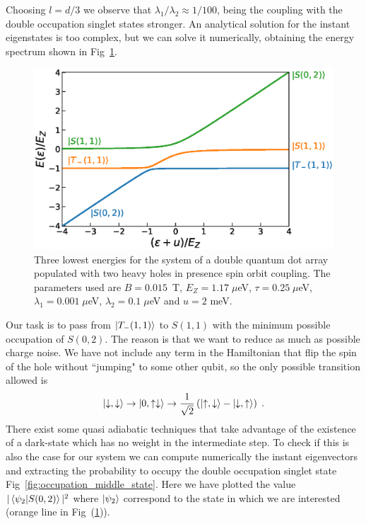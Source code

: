 \documentclass[a4paper,11pt]{article}
\begin{document}
Choosing $l=d/3$ we observe that $\lambda_1/\lambda_2\approx 1/100$, being the coupling with the double occupation singlet states stronger. An analytical solution for the instant eigenstates is too complex, but we can solve it numerically, obtaining the energy spectrum shown in Fig~\ref{fig:eigenenergies_2QD_2HH_w_SOC}.
\begin{figure}[!htbp]
	\centering
	\includegraphics[width=0.8\linewidth]{eigenenergies_2QD_2HH_w_SOC.eps}
	\caption{Three lowest energies for the system of a double quantum dot array populated with two heavy holes in presence spin orbit coupling. The parameters used are $B=0.015$~T, $E_Z=1.17\; \mu$eV, $\tau=0.25\; \mu$eV, $\lambda_1=0.001\; \mu$eV, $\lambda_2=0.1\; \mu$eV and $u=2$ meV.}
	\label{fig:eigenenergies_2QD_2HH_w_SOC}
\end{figure}
Our task is to pass from $\ket{T_-(1,1)}$ to $S(1,1)$ with the minimum possible occupation of $S(0,2)$. The reason is that we want to reduce as much as possible charge noise. We have not include any term in the Hamiltonian that flip the spin of the hole without ``jumping" to some other qubit, so the only possible transition allowed is
\begin{equation}
	\ket{\downarrow,\downarrow}\rightarrow \ket{0,\uparrow\downarrow} \rightarrow \frac{1}{\sqrt{2}}\left(\ket{\uparrow,\downarrow}-\ket{\downarrow,\uparrow}\right)\; .
\end{equation}
There exist some quasi adiabatic techniques that take advantage of the existence of a dark-state which has no weight in the intermediate step. To check if this is also the case for our system we can compute numerically the instant eigenvectors and extracting the probability to occupy the double occupation singlet state Fig~\ref{fig:occupation_middle_state}. Here we have plotted the value $|\braket{\psi_2}{S(0,2)}|^2$ where $\ket{\psi_2}$ correspond to the state in which we are interested (orange line in Fig~(\ref{fig:eigenenergies_2QD_2HH_w_SOC})).
\end{document}
